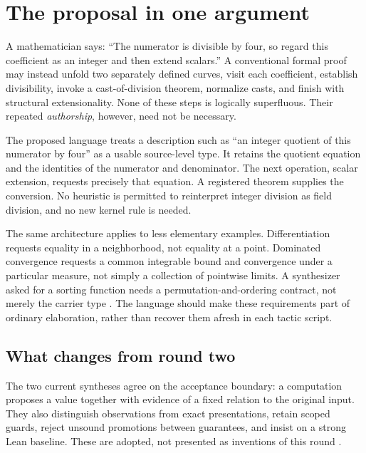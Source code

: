 \documentclass[11pt,letterpaper]{article}
\theoremstyle{definition}\newtheorem{definition}[theorem]{Definition}
\newcommand{\code}[1]{\texttt{\detokenize{#1}}}
\begin{document}
\tableofcontents
\clearpage

\section{The proposal in one argument}\label{sec:thesis}
A mathematician says: ``The numerator is divisible by four, so regard this coefficient as an integer and then extend scalars.'' A conventional formal proof may instead unfold two separately defined curves, visit each coefficient, establish divisibility, invoke a cast-of-division theorem, normalize casts, and finish with structural extensionality. None of these steps is logically superfluous. Their repeated \emph{authorship}, however, need not be necessary.

The proposed language treats a description such as ``an integer quotient of this numerator by four'' as a usable source-level type. It retains the quotient equation and the identities of the numerator and denominator. The next operation, scalar extension, requests precisely that equation. A registered theorem supplies the conversion. No heuristic is permitted to reinterpret integer division as field division, and no new kernel rule is needed.

The same architecture applies to less elementary examples. Differentiation requests equality in a neighborhood, not equality at a point. Dominated convergence requests a common integrable bound and convergence under a particular measure, not simply a collection of pointwise limits. A synthesizer asked for a sorting function needs a permutation-and-ordering contract, not merely the carrier type \code{List A -> List A}. The language should make these requirements part of ordinary elaboration, rather than recover them afresh in each tactic script.

\subsection{What changes from round two}
The two current syntheses agree on the acceptance boundary: a computation proposes a value together with evidence of a fixed relation to the original input. They also distinguish observations from exact presentations, retain scoped guards, reject unsound promotions between guarantees, and insist on a strong Lean baseline. These are adopted, not presented as inventions of this round \cite{reportA,reportB}.
\end{document}
